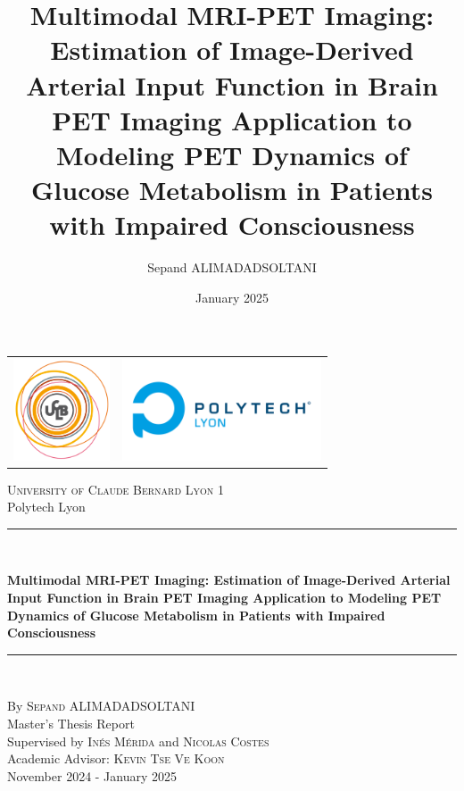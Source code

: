 \documentclass[a4paper,12pt,twoside,english,openany]{book}
[a4paper,12pt,twoside]
\title{Multimodal MRI-PET Imaging: Estimation of Image-Derived Arterial Input Function in Brain PET Imaging Application to Modeling PET Dynamics of Glucose Metabolism in Patients with Impaired Consciousness}
\author{Sepand ALIMADADSOLTANI}
\date{January 2025}
\begin{document}
\begin{titlepage}
	\begin{center}
		\begin{tabular}{c@{\hskip 7cm}c@{\hskip 1cm}}
			\includegraphics[height=3cm]{res/ucbl.png} &
			\includegraphics[height=3cm]{res/polytech.png}
		\end{tabular}
	\end{center}

	\begin{center}

		\vspace*{.03\textheight}
		\textsc{\Large University of Claude Bernard Lyon 1 }\\[0.2cm]
		\large Polytech Lyon

		\rule{\textwidth}{0.8pt} \\
		\vspace{10pt}

		{\Large \bfseries Multimodal MRI-PET Imaging:
			Estimation of Image-Derived Arterial Input Function in Brain PET Imaging
			Application to Modeling PET Dynamics of Glucose Metabolism in Patients with Impaired Consciousness
		}
		\rule{\textwidth}{0.8pt} \\

	\end{center}

	\vfill
	\begin{center}
		By \textsc{\Large Sepand ALIMADADSOLTANI}\\[1cm]
		Master's Thesis Report\\[1.2cm]
		Supervised by \textsc{\large Inés Mérida}
		and
		\textsc{\large Nicolas Costes}  \\[0.2cm]
		Academic Advisor: \textsc{\large Kevin Tse Ve Koon}\\[0.2cm]
		November 2024 - January 2025

	\end{center}

	\vspace{1cm}
\end{titlepage}
\end{document}
